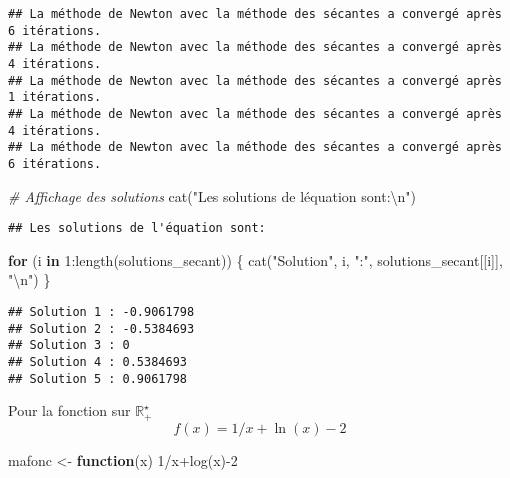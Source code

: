 \documentclass[
]{article}
\newenvironment{Shaded}{\begin{snugshade}}{\end{snugshade}}
\newcommand{\CommentTok}[1]{\textcolor[rgb]{0.56,0.35,0.01}{\textit{#1}}}
\newcommand{\ControlFlowTok}[1]{\textcolor[rgb]{0.13,0.29,0.53}{\textbf{#1}}}
\newcommand{\DecValTok}[1]{\textcolor[rgb]{0.00,0.00,0.81}{#1}}
\newcommand{\FunctionTok}[1]{\textcolor[rgb]{0.00,0.00,0.00}{#1}}
\newcommand{\NormalTok}[1]{#1}
\newcommand{\OtherTok}[1]{\textcolor[rgb]{0.56,0.35,0.01}{#1}}
\newcommand{\SpecialCharTok}[1]{\textcolor[rgb]{0.00,0.00,0.00}{#1}}
\newcommand{\StringTok}[1]{\textcolor[rgb]{0.31,0.60,0.02}{#1}}
\begin{document}
\begin{verbatim}
## La méthode de Newton avec la méthode des sécantes a convergé après 6 itérations.
## La méthode de Newton avec la méthode des sécantes a convergé après 4 itérations.
## La méthode de Newton avec la méthode des sécantes a convergé après 1 itérations.
## La méthode de Newton avec la méthode des sécantes a convergé après 4 itérations.
## La méthode de Newton avec la méthode des sécantes a convergé après 6 itérations.
\end{verbatim}

\begin{Shaded}
\begin{Highlighting}[]
\CommentTok{\# Affichage des solutions}
\FunctionTok{cat}\NormalTok{(}\StringTok{"Les solutions de l\textquotesingle{}équation sont:}\SpecialCharTok{\textbackslash{}n}\StringTok{"}\NormalTok{)}
\end{Highlighting}
\end{Shaded}

\begin{verbatim}
## Les solutions de l'équation sont:
\end{verbatim}

\begin{Shaded}
\begin{Highlighting}[]
\ControlFlowTok{for}\NormalTok{ (i }\ControlFlowTok{in} \DecValTok{1}\SpecialCharTok{:}\FunctionTok{length}\NormalTok{(solutions\_secant)) \{}
  \FunctionTok{cat}\NormalTok{(}\StringTok{"Solution"}\NormalTok{, i, }\StringTok{":"}\NormalTok{, solutions\_secant[[i]], }\StringTok{"}\SpecialCharTok{\textbackslash{}n}\StringTok{"}\NormalTok{)}
\NormalTok{\}}
\end{Highlighting}
\end{Shaded}

\begin{verbatim}
## Solution 1 : -0.9061798 
## Solution 2 : -0.5384693 
## Solution 3 : 0 
## Solution 4 : 0.5384693 
## Solution 5 : 0.9061798
\end{verbatim}

Pour la fonction sur \(\mathbb R_+^\star\) \[
f(x) = 1/x+\ln(x)-2
\]

\begin{Shaded}
\begin{Highlighting}[]
\NormalTok{mafonc }\OtherTok{\textless{}{-}} \ControlFlowTok{function}\NormalTok{(x) }\DecValTok{1}\SpecialCharTok{/}\NormalTok{x}\SpecialCharTok{+}\FunctionTok{log}\NormalTok{(x)}\SpecialCharTok{{-}}\DecValTok{2}
\end{Highlighting}
\end{Shaded}
\end{document}
